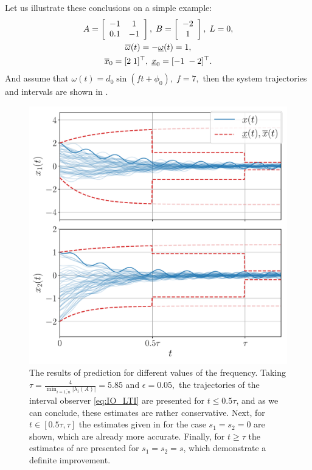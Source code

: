 \begin{example*}
	Let us illustrate these conclusions on a simple example:
	\begin{gather*}
	A=\left[\begin{array}{cc}
	-1 & 1\\
	0.1 & -1
	\end{array}\right],\;B=\left[\begin{array}{c}
	-2\\
	1
	\end{array}\right],\;L=0,\\
	\overline{\omega}(t)=-\underline{\omega}(t)=1,\\
	\overline{x}_{0}=[2\;1]^{\top},\;\underline{x}_{0}=[-1\;-2]^{\top}.
	\end{gather*}
	And assume that
	$
	\omega(t)=d_0\sin(ft+\phi_0),\;f=7,
	$
	then the system trajectories and intervals are shown in . 
	\begin{figure}
		\begin{centering}
			\includegraphics[width=0.8\linewidth]{img/asymptotic}
			\par\end{centering}
		\caption{\label{fig:IntFreq} The results of prediction for different values
			of the frequency. Taking $\tau=\frac{4}{\min_{i=\overline{1,n}}|\lambda_{i}(A)|}=5.85$ and $\epsilon=0.05,$ the trajectories of the interval observer \eqref{eq:IO_LTI} are presented for $t\leq0.5\tau$, and as we can conclude, these estimates are rather conservative. Next, for $t\in[0.5\tau,\tau]$ the estimates given in  for the case $s_{1}=s_{2}=0$ are shown, which are already more accurate. Finally, for $t\geq\tau$ the estimates of  are presented for $s_{1}=s_{2}=s$, which demonstrate a definite improvement. }
	\end{figure}
\end{example*}

